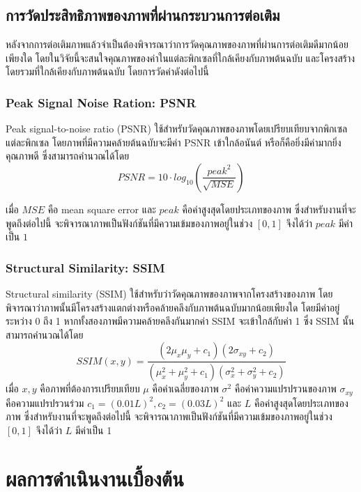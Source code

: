 \documentclass[hidelinks, a4paper,12pt]{article}
\numberwithin{equation}{section}							%
\numberwithin{equation}{section}
\begin{document}
{\clearpage
\subsection{การวัดประสิทธิภาพของภาพที่ผ่านกระบวนการต่อเติม}
\hspace{1cm} หลังจากการต่อเติมภาพแล้วจำเป็นต้องพิจารณาว่าการวัดคุณภาพของภาพที่ผ่านการต่อเติมดีมากน้อยเพียงใด โดยในวิจัยนี้จะสนใจคุณภาพของค่าในแต่ละพิกเซลที่ใกล้เคียงกับภาพต้นฉบับ และโครงสร้างโดยรวมที่ใกล้เคียงกับภาพต้นฉบับ โดยการวัดค่าดังต่อไปนี้

\subsubsection{Peak Signal Noise Ration: PSNR}
\hspace{1cm}  Peak signal-to-noise ratio (PSNR) \cite{ref:PSNR} ใช้สำหรับวัดคุณภาพของภาพโดยเปรียบเทียบจากพิกเซลแต่ละพิกเซล โดยภาพที่มีความคล้ายต้นฉบับจะมีค่า PSNR เข้าใกล้อนันต์ หรือก็คือยิ่งมีค่ามากยิ่งคุณภาพดี ซึ่งสามารถคำนวณได้โดย
$$ PSNR = 10 \cdot log_{10} ( \frac{{peak}^2}{\sqrt{MSE}} )$$

เมื่อ $MSE$ คือ mean square error และ $peak$ คือค่าสูงสุดโดยประเภทของภาพ ซึ่งสำหรับงานที่จะพูดถึงต่อไปนี้ จะพิจารณาภาพเป็นฟังก์ชันที่มีความเข้มของภาพอยู่ในช่วง $ [0,1] $ จึงได้ว่า $peak$ มีค่าเป็น $1$

\subsubsection{Structural Similarity: SSIM}
\hspace{1cm} Structural similarity (SSIM)  \cite{ref:SSIM} ใช้สำหรับว่าวัดคุณภาพของภาพจากโครงสร้างของภาพ โดยพิจารณาว่าภาพนั้นมีโครงสร้างแตกต่างหรือคล้ายคลึงกับภาพต้นฉบับมากน้อยเพียงใด โดยมีค่าอยู่ระหว่าง 0 ถึง 1 หากทั้งสองภาพมีความคล้ายคลึงกันมากค่า SSIM  จะเข้าใกล้กับค่า 1 ซึ่ง SSIM นั้นสามารถคำนวณได้โดย
$$ SSIM(x,y) = \frac{(2\mu_x\mu_y + c_1)(2\sigma_{xy} + c_2)}{(\mu_x^2+\mu_y^2+c_1)(\sigma_x^2+\sigma_y^2+c_2)}$$
เมื่อ $x,y$ คือภาพที่ต้องการเปรียบเทียบ $\mu$ คือค่าเฉลี่ยของภาพ $\sigma^2$ คือค่าความแปรปรวนของภาพ $\sigma_{xy}$ คือความแปรปรวนร่วม $c_1 =  (0.01L)^2, c_2 = (0.03L)^2$ และ $L$ คือค่าสูงสุดโดยประเภทของภาพ ซึ่งสำหรับงานที่จะพูดถึงต่อไปนี้ จะพิจารณาภาพเป็นฟังก์ชันที่มีความเข้มของภาพอยู่ในช่วง $ [0,1] $ จึงได้ว่า $L$ มีค่าเป็น 1

\clearpage
\section{ผลการดำเนินงานเบื้องต้น}
}
\end{document}
